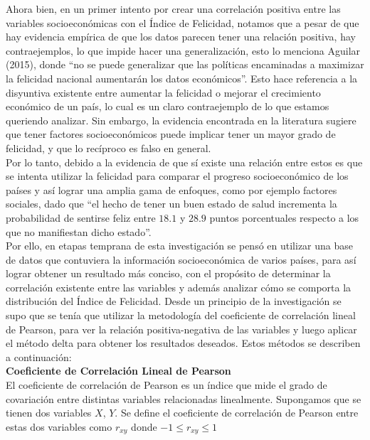 Ahora bien, en un primer intento por crear una correlación positiva entre las variables socioeconómicas con el Índice de Felicidad, notamos que a pesar de que hay evidencia empírica de que los datos parecen tener una relación positiva, hay contraejemplos, lo que impide hacer una generalización, esto lo menciona Aguilar (2015), donde ``no se puede generalizar que las políticas encaminadas a maximizar la felicidad nacional aumentarán los datos económicos''. Esto hace referencia a la disyuntiva existente entre aumentar la felicidad o mejorar el crecimiento económico de un país, lo cual es un claro contraejemplo de lo que estamos queriendo analizar. Sin embargo, la evidencia encontrada en la literatura sugiere que tener factores socioeconómicos puede implicar tener un mayor grado de felicidad, y que lo recíproco es falso en general. \\

Por lo tanto, debido a la evidencia de que sí existe una relación entre estos es que se intenta utilizar la felicidad para comparar el progreso socioeconómico de los países y así lograr una amplia gama de enfoques, como por ejemplo factores sociales, dado que ``el hecho de tener un buen estado de salud incrementa la probabilidad de sentirse feliz entre $18.1$ y $28.9$ puntos porcentuales respecto a los que no manifiestan dicho estado''.\\

Por ello, en etapas temprana de esta investigación se pensó en utilizar una base de datos que contuviera la información socioeconómica de varios países, para así lograr obtener un resultado más conciso, con el propósito de determinar la correlación existente entre las variables y además analizar cómo se comporta la distribución del Índice de Felicidad. Desde un principio de la investigación se supo que se tenía que utilizar la metodología del coeficiente de correlación lineal de Pearson, para ver la relación positiva-negativa de las variables y luego aplicar el método delta para obtener los resultados deseados. Estos métodos se describen a continuación: \\

\noindent\textbf{Coeficiente de Correlación Lineal de Pearson} \\
    
El coeficiente de correlación de Pearson es un índice que mide el grado de covariación entre distintas variables relacionadas linealmente. Supongamos que se tienen dos variables $X$, $Y$. Se define el coeficiente de correlación de Pearson entre estas dos variables como $r_{xy}$ donde $-1 \leq r_{xy} \leq 1$
    
